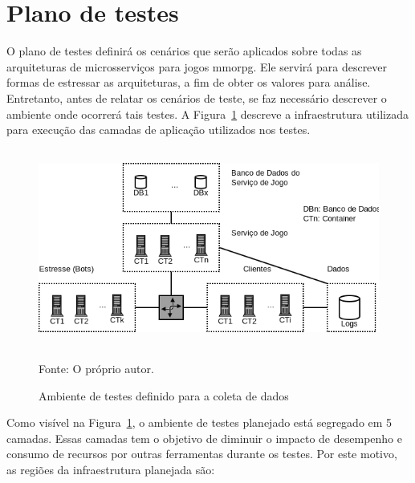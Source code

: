 

\section {Plano de testes}
\label{sec:plano}



O plano de testes definirá os cenários que serão aplicados sobre todas as arquiteturas de microsserviços para jogos \ac{mmorpg}.
%
Ele servirá para descrever formas de estressar as arquiteturas, a fim de obter os valores para análise.
%
Entretanto, antes de relatar os cenários de teste, se faz necessário descrever o ambiente onde ocorrerá tais testes.
%
A Figura~\ref{Ambiente de testes} descreve a infraestrutura utilizada para execução das camadas de aplicação utilizados nos testes.



\begin{figure}[htb!]
  \caption{Ambiente de testes definido para a coleta de dados}
  \label{Ambiente de testes}
  \includegraphics[height=6.5cm]{img/cap3/infraestrutura.png}
  \centering

  Fonte: O próprio autor.
\end{figure}



Como visível na Figura~\ref{Ambiente de testes}, o ambiente de testes planejado está segregado em 5 camadas.
%
Essas camadas tem o objetivo de diminuir o impacto de desempenho e consumo de recursos por outras ferramentas durante os testes.
%
Por este motivo, as regiões da infraestrutura planejada são:



